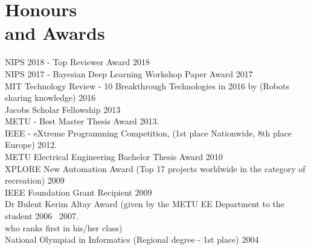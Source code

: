 
\section{\mysidestyle \textcolor{olgray}{Honours \\and Awards}}
NIPS 2018 - Top Reviewer Award \hfill 2018 \vspace{1mm}\\
NIPS 2017 - Bayesian Deep Learning Workshop Paper Award \hfill 2017 \vspace{1mm}\\
MIT Technology Review - 10 Breakthrough Technologies in 2016 by  (Robots sharing knowledge) \hfill 2016 \vspace{1mm}\\
Jacobs Scholar Fellowship \hfill 2013 \vspace{1mm}\\
METU - Best Master Thesis Award \hfill  2013{\color{white}.}\vspace{1mm}\\
IEEE - eXtreme Programming Competition,  (1st place Nationwide, 8th place Europe) \hfill 2012{\color{white}.}\vspace{1mm}\\
METU Electrical Engineering Bachelor Thesis Award  \hfill 2010 \vspace{1mm}\vspace{1mm}\\
XPLORE New Automation Award (Top 17 projects worldwide in the category of recreation)  \hfill 2009 \vspace{1mm}\vspace{1mm}\\
IEEE Foundation Grant Recipient \hfill 2009 \vspace{1mm}\vspace{1mm}\\
Dr Bulent Kerim Altay Award  (given by the METU EE Department to the student \hfill 2006 \textendash ~2007{\color{white}.}\\ who ranks first in his/her class) \vspace{1mm}\vspace{1mm}\\
National Olympiad in Informatics (Regional degree - 1st place) \hfill 2004 \vspace{1mm}\vspace{1mm}\\
\vspace{-4mm}
